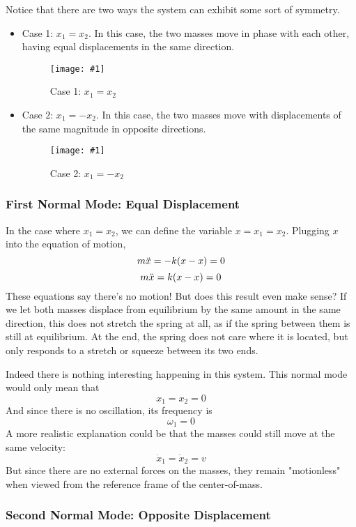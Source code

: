 \documentclass[11pt]{article}
\newcommand{\fig}[4]{
    \begin{figure}[H]
        \centering
        \texttt{[image: \#1]}
        \caption{#2}
        \label{exp4fit}
    \end{figure}
}
\theoremstyle{gangnamstyle}{\newtheorem{definition}{Definition}[]}
\theoremstyle{gangnamstyle}{\newtheorem{example}{Example}[]}
\theoremstyle{gangnamstyle}{\newtheorem{problem}{Problem}[]}
\theoremstyle{gangnamstyle}{\newtheorem{warning}{Warning}[]}
\begin{document}
Notice that there are two ways the system can exhibit some sort of symmetry. 

\begin{itemize}
\item Case 1: $x_1 = x_2$. In this case, the two masses move in phase with each other, having equal displacements in the same direction. 
\fig{figs/n3/same.jpg}{Case 1: $x_1 = x_2$}{1}{0}
\item Case 2: $x_1 = -x_2$. In this case, the two masses move with displacements of the same magnitude in opposite directions. 
\fig{figs/n3/opposite.jpg}{Case 2: $x_1 = -x_2$}{1}{0}
\end{itemize}

\subsubsection{First Normal Mode: Equal Displacement}

In the case where $x_1 = x_2$, we can define the variable $x = x_1 = x_2$. Plugging $x$ into the equation of motion, 
\[ m\Ddot{x} = -k(x - x) = 0 \]
\[ m\Ddot{x} = k(x - x) = 0 \]
These equations say there's no motion! But does this result even make sense? If we let both masses displace from equilibrium by the same amount in the same direction, this does not stretch the spring at all, as if the spring between them is still at equilibrium. At the end, the spring does not care where it is located, but only responds to a stretch or squeeze between its two ends. 

Indeed there is nothing interesting happening in this system. This normal mode would only mean that
\[ x_1 = x_2 = 0 \]
And since there is no oscillation, its frequency is
\[ \omega_1 = 0 \]
A more realistic explanation could be that the masses could still move at the same velocity:
\[ \Dot{x}_1 = \Dot{x}_2 = v \]
But since there are no external forces on the masses, they remain "motionless" when viewed from the reference frame of the center-of-mass. 

\subsubsection{Second Normal Mode: Opposite Displacement}
\end{document}
